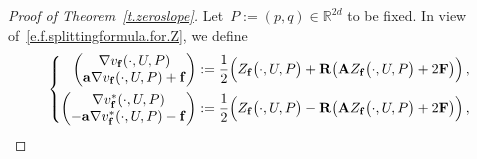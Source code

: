 \documentclass[11pt,twoside]{article} %
\numberwithin{equation}{section}
\theoremstyle{definition}
\let\originalleft\left
\let\originalright\right
\renewcommand{\left}{\mathopen{}\mathclose\bgroup\originalleft}
\renewcommand{\right}{\aftergroup\egroup\originalright}
\newcommand*{\R}{\ensuremath{\mathbb{R}}}
\newcommand{\f}{\mathbf{f}}
\renewcommand{\a}{\mathbf{a}}
\newcommand{\bfA}{\mathbf{A}}
\newcommand{\bfF}{\mathbf{F}}
\newcommand{\rota}{\mathbf{R}}
\begin{document}
\begin{proof}[{Proof of Theorem~\ref{t.zeroslope}}]
Let~$P := (p,q)\in \R^{2d}$ to be fixed.  In view of~\eqref{e.f.splittingformula.for.Z}, we define
\begin{align*}  
\left\{
\begin{aligned}
\begin{pmatrix} \nabla v_{\f}(\cdot,U,P)  \\ \a \nabla v_{\f}(\cdot,U,P) + \f \end{pmatrix}  
:=
\frac12 \Bigl( Z_{\f}\bigl(\cdot,U,P \bigr) + \rota \bigl( \bfA Z_{\f}\bigl (\cdot,U,P \bigr) + 2 \bfF\bigr) \Bigr) \,,
\\
\begin{pmatrix} \nabla v_{\f}^*(\cdot,U,P)  \\ - \a \nabla v_{\f}^*(\cdot,U,P) - \f \end{pmatrix}  
:=
\frac12 \Bigl( Z_{\f}\bigl(\cdot,U,P \bigr) - \rota \bigl( \bfA Z_{\f}\bigl (\cdot,U,P \bigr) + 2 \bfF\bigr) \Bigr) \,,
\end{aligned}
\right.
\end{align*}

\smallskip


\end{proof}
\end{document}
